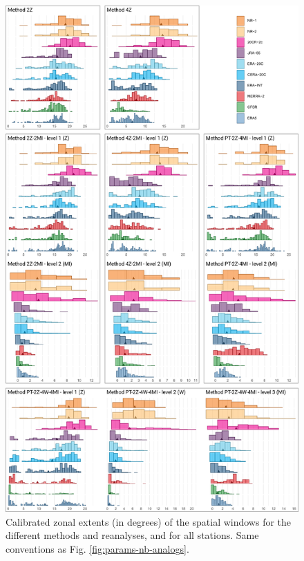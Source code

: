 \documentclass[alpha-refs]{wiley-article}
\begin{document}
\begin{figure}[btp]
	\centering
	\includegraphics[width=115mm]{figure-4.pdf}
	\caption{Calibrated zonal extents (in degrees) of the spatial windows for the different methods and reanalyses, and for all stations. Same conventions as Fig. \protect\ref{fig:params-nb-analogs}.}
	\label{fig:params-xwidth}
\end{figure}
\end{document}
